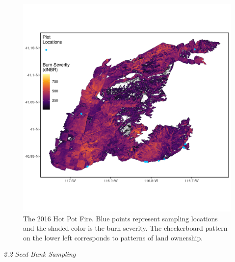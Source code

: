 \documentclass[
  12pt,
]{article}
\begin{document}
\begin{figure}
\centering
\includegraphics{images/map.png}
\caption{The 2016 Hot Pot Fire. Blue points represent sampling locations
and the shaded color is the burn severity. The checkerboard pattern on
the lower left corresponds to patterns of land ownership.}
\end{figure}

\emph{2.2 Seed Bank Sampling}
\end{document}

